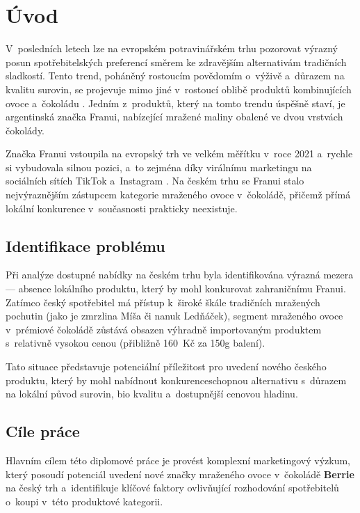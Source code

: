 \chapter{Úvod}
\label{chap:introduction}

V~posledních letech lze na evropském potravinářském trhu pozorovat výrazný posun spotřebitelských preferencí směrem ke zdravějším alternativám tradičních sladkostí. Tento trend, poháněný rostoucím povědomím o~výživě a~důrazem na kvalitu surovin, se projevuje mimo jiné v~rostoucí oblibě produktů kombinujících ovoce a~čokoládu \parencite{anselmsson_2014}. Jedním z~produktů, který na tomto trendu úspěšně staví, je argentinská značka Franui, nabízející mražené maliny obalené ve dvou vrstvách čokolády.

Značka Franui vstoupila na evropský trh ve velkém měřítku v~roce 2021 a~rychle si vybudovala silnou pozici, a~to zejména díky virálnímu marketingu na sociálních sítích TikTok a~Instagram \parencite{franui_web}. Na českém trhu se Franui stalo nejvýraznějším zástupcem kategorie mraženého ovoce v~čokoládě, přičemž přímá lokální konkurence v~současnosti prakticky neexistuje.

\section{Identifikace problému}

Při analýze dostupné nabídky na českém trhu byla identifikována výrazná mezera — absence lokálního produktu, který by mohl konkurovat zahraničnímu Franui. Zatímco český spotřebitel má přístup k~široké škále tradičních mražených pochutin (jako je zmrzlina Míša či nanuk Ledňáček), segment mraženého ovoce v~prémiové čokoládě zůstává obsazen výhradně importovaným produktem s~relativně vysokou cenou (přibližně 160~Kč za 150g balení).

Tato situace představuje potenciální příležitost pro uvedení nového českého produktu, který by mohl nabídnout konkurenceschopnou alternativu s~důrazem na lokální původ surovin, \gls{bio} kvalitu a~dostupnější cenovou hladinu.

\section{Cíle práce}

Hlavním cílem této diplomové práce je provést komplexní marketingový výzkum, který posoudí potenciál uvedení nové značky mraženého ovoce v~čokoládě \textbf{Berrie} na český trh a~identifikuje klíčové faktory ovlivňující rozhodování spotřebitelů o~koupi v~této produktové kategorii.

